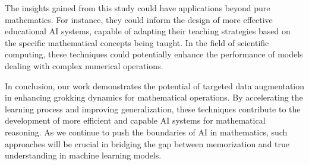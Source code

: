\documentclass{article} %
\begin{document}
The insights gained from this study could have applications beyond pure mathematics. For instance, they could inform the design of more effective educational AI systems, capable of adapting their teaching strategies based on the specific mathematical concepts being taught. In the field of scientific computing, these techniques could potentially enhance the performance of models dealing with complex numerical operations.

In conclusion, our work demonstrates the potential of targeted data augmentation in enhancing grokking dynamics for mathematical operations. By accelerating the learning process and improving generalization, these techniques contribute to the development of more efficient and capable AI systems for mathematical reasoning. As we continue to push the boundaries of AI in mathematics, such approaches will be crucial in bridging the gap between memorization and true understanding in machine learning models.



\end{document}
